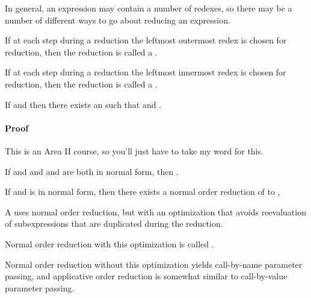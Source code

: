 \documentclass[fleqn]{seminar}
\begin{document}
\begin{slide}
\vspace{2ex}

In general, an expression may contain a number of redexes, so there may be
a number of different ways to go about reducing an expression.

\vspace{2ex}

If at each step during a reduction the leftmost outermost redex is chosen for reduction,
then the reduction is called a .

\vspace{2ex}

If at each step during a reduction the leftmost innermost redex is chosen for reduction,
then the reduction is called a .

\newslide

\begin{theorem}
If  and 
then there exists an  such that  and
.
\end{theorem}

\paragraph{Proof}  This is an Area II course, so you'll just have to take my word for this.

\vspace{2ex}

\begin{corollary}
If  and 
and  and  are both in normal form, then .
\end{corollary}

\newslide

\begin{theorem}
If  and  is in normal form, then
there exists a normal order reduction of  to ,
\end{theorem}

A  uses normal order reduction, but with an
optimization that avoids reevaluation of
subexpressions that are duplicated during the reduction.

Normal order reduction with this optimization is called .

Normal order reduction without this optimization
yields call-by-name parameter passing,
and applicative order reduction is somewhat similar
to call-by-value parameter passing.

\end{slide}
\end{document}

